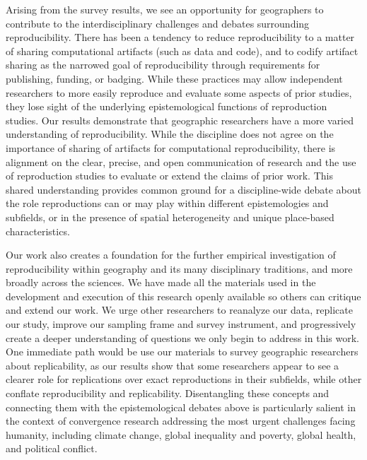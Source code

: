 \documentclass[]{interact}
\theoremstyle{plain}%
\theoremstyle{definition}
\theoremstyle{remark}
\begin{document}
Arising from the survey results, we see an opportunity for geographers to contribute to the interdisciplinary challenges and debates surrounding reproducibility.
There has been a tendency to reduce reproducibility to a matter of sharing computational artifacts (such as data and code), and to codify artifact sharing as the narrowed goal of reproducibility through requirements for publishing, funding, or badging.
While these practices may allow independent researchers to more easily reproduce and evaluate some aspects of prior studies, they lose sight of the underlying epistemological functions of reproduction studies.
Our results demonstrate that geographic researchers have a more varied understanding of reproducibility. 
While the discipline does not agree on the importance of sharing of artifacts for computational reproducibility, there is alignment on the clear, precise, and open communication of research and the use of reproduction studies to evaluate or extend the claims of prior work.
This shared understanding provides common ground for a discipline-wide debate about the role reproductions can or may play within different epistemologies and subfields, or in the presence of spatial heterogeneity and unique place-based characteristics. 

Our work also creates a foundation for the further empirical investigation of reproducibility within geography and its many disciplinary traditions, and more broadly across the sciences. 
We have made all the materials used in the development and execution of this research openly available so others can critique and extend our work.
We urge other researchers to reanalyze our data, replicate our study, improve our sampling frame and survey instrument, and progressively create a deeper understanding of questions we only begin to address in this work. 
One immediate path would be use our materials to survey geographic researchers about replicability, as our results show that some researchers appear to see a clearer role for replications over exact reproductions in their subfields, while other conflate reproducibility and replicability.
Disentangling these concepts and connecting them with the epistemological debates above is particularly salient in the context of convergence research addressing the most urgent challenges facing humanity, including climate change, global inequality and poverty, global health, and political conflict.


\theendnotes


\newpage
\end{document}
